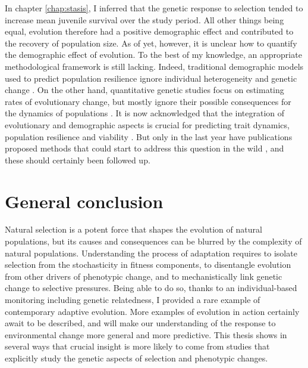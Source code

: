 In chapter \ref{chap:stasis}, I inferred that the genetic response to selection tended to increase mean juvenile survival over the study period. All other things being equal, evolution therefore had a positive demographic effect and contributed to the recovery of population size. As of yet, however, it is unclear how to quantify the demographic effect of evolution. To the best of my knowledge, an appropriate methodological framework is still lacking. 
Indeed, traditional demographic models used to predict population resilience ignore individual heterogeneity and genetic change \parencite{Kendall2011, vindenes2015, Plard2016}. On the other hand, quantitative genetic studies focus on estimating rates of evolutionary change, but mostly ignore their possible consequences for the dynamics of populations \parencite{Coulson2010,Chevin2012}.
It is now acknowledged that the integration of evolutionary and demographic aspects is crucial for predicting trait dynamics, population resilience and viability \parencite{Schoener2011,Pelletier2012,Chevin2012,Merila2014}. But only in the last year have publications proposed methods that could start to address this question in the wild \parencite{vindenes2015, Coulson2015, Childs2016}, and these should certainly been followed up. 

\section{General conclusion}
Natural selection is a potent force that shapes the evolution of natural populations, but its causes and consequences can be blurred by the complexity of natural populations.
Understanding the process of adaptation requires to isolate selection from the stochasticity in fitness components, to disentangle evolution from other drivers of phenotypic change, and to mechanistically link genetic change to selective pressures.
Being able to do so, thanks to an individual-based monitoring including genetic relatedness, I provided a rare example of contemporary adaptive evolution. More examples of evolution in action certainly await to be described, and will make our understanding of the response to environmental change more general and more predictive. This thesis shows in several ways that crucial insight is more likely to come from studies that explicitly study the genetic aspects of selection and phenotypic changes.


